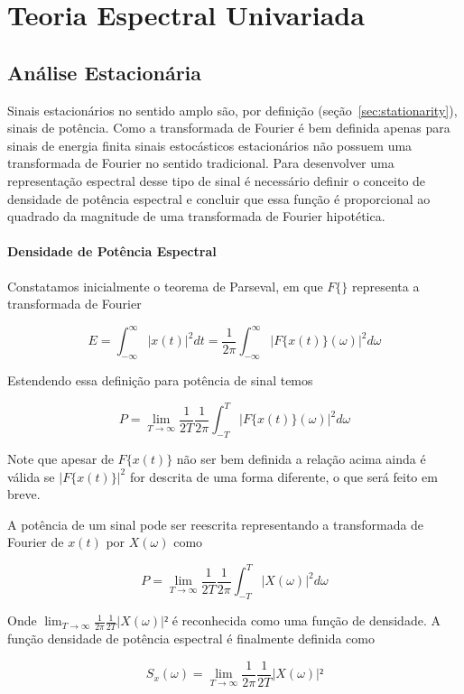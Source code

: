 \chapter{Teoria Espectral Univariada}\label{chap:spectral_analysis}


\section{Análise Estacionária}

Sinais estacionários no sentido amplo são, por definição
(seção~\ref{sec:stationarity}), sinais de potência. Como a transformada de
Fourier é bem definida apenas para sinais de energia finita sinais estocásticos
estacionários não possuem uma transformada de Fourier no sentido tradicional.
Para desenvolver uma representação espectral desse tipo de sinal é necessário
definir o conceito de densidade de potência espectral e concluir que essa
função é proporcional ao quadrado da magnitude de uma transformada de Fourier
hipotética.

\subsubsection{Densidade de Potência Espectral}

Constatamos inicialmente o teorema de Parseval, em que $F\{\}$ representa a
transformada de Fourier

$$ E = \int^{\infty}_{-\infty} |x(t)|^2 dt = \frac{1}{2\pi} \int^{\infty}_{-\infty} |F\{x(t)\}(\omega)|^2 d\omega $$

Estendendo essa definição para potência de sinal temos

$$ P = \lim_{T \to \infty} \frac{1}{2T}\frac{1}{2\pi} \int^{T}_{-T}|F\{x(t)\}(\omega)|^2 d\omega$$

Note que apesar de $F\{x(t)\}$ não ser bem definida a relação acima ainda é
válida se $|F\{x(t)\}|^2$ for descrita de uma forma diferente, o que será
feito em breve.

A potência de um sinal pode ser reescrita representando a transformada de
Fourier de $x(t)$ por $X(\omega)$ como

$$ P = \lim_{T \to \infty} \frac{1}{2T}\frac{1}{2\pi} \int^{T}_{-T}|X(\omega)|^2 d\omega $$

Onde $\lim_{T \to \infty}\frac{1}{2\pi} \frac{1}{2T} |X(\omega)|² $
é reconhecida como uma função de densidade. A função densidade de potência
espectral é finalmente definida como

$$ S_{x}(\omega) = \lim_{T \to \infty}\frac{1}{2\pi} \frac{1}{2T} |X(\omega)|² $$

